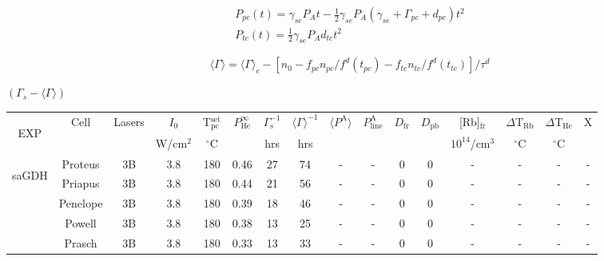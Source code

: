 \documentclass[pdftex,letterpaper,12pt]{report}
\begin{document}
	
\begin{subequations}\label{InitialSpinup}
	\begin{gather}
	P_{pc}(t)=\gamma_{se}P_{A}t-\frac{1}{2}\gamma_{se}P_{A}(\gamma_{se}+\Gamma_{pc}+d_{pc})t^{2}\\
	P_{tc}(t)=\frac{1}{2}\gamma_{se}P_{A}d_{tc}t^{2}
	\end{gather}
\end{subequations}

\begin{equation}
\langle \Gamma\rangle=\langle \Gamma\rangle_{c}-[n_{0}-f_{pc}n_{pc}/f^{d}(t_{pc})- f_{tc}n_{tc}/f^{d}(t_{tc})]/\tau^{d}
\end{equation}

$(\Gamma_{s}-\langle \Gamma\rangle)$  

\begin{table}\scriptsize
	\begin{center}
		\begin{tabular}{|c|c|ccc|ccc|ccccc|cc|c|}
			\hline
			\multirow{2}{*}{\begin{sideways}{EXP}\end{sideways}}&\multirow{2}{*}{Cell} & \multirow{2}{*}{Lasers} & $I_0$ & T$_\mathrm{pc}^\mathrm{set}$ & \multirow{2}{*}{$P_\mathrm{He}^\infty$} & $\Gamma_\mathrm{s}^{-1}$ & $\langle\Gamma\rangle^{-1}$ & \multirow{2}{*}{$\langle P^\mathrm{A} \rangle$} & \multirow{2}{*}{$P_\mathrm{line}^\mathrm{A}$} & \multirow{2}{*}{$D_\mathrm{fr}$} & \multirow{2}{*}{$D_\mathrm{pb}$} & [Rb]$_\mathrm{fr}$ & $\Delta$T$_\mathrm{Rb}$ & $\Delta$T$_\mathrm{He}$ & \multirow{2}{*}{X}\\
			&& & W/cm$^2$ & $^\circ$C & & hrs & hrs & & & & & $10^{14}$/cm$^3$ & $^\circ$C & $^\circ$C &\\
			\hline
			\hline
			\multirow{5}{*}{\begin{sideways}saGDH\end{sideways}} & Proteus & 3B & 3.8 & 180 & 0.46 & 27 & 74 & - & - & 0 & 0 & - & - & - & -\\
			\cline{2-16}
			& Priapus & 3B & 3.8 & 180 & 0.44 & 21 & 56 & - & - & 0 & 0 & - & - & - & -\\
			\cline{2-16}
			& Penelope & 3B & 3.8 & 180 & 0.39 & 18 & 46 & - & - & 0 & 0 & - & - & - & -\\
			\cline{2-16}
			& Powell & 3B & 3.8 & 180 & 0.38 & 13 & 25 & - & - & 0 & 0 & - & - & - & -\\
			\cline{2-16}
			& Prasch & 3B & 3.8 & 180 & 0.33 & 13 & 33 & - & - & 0 & 0 & - & - & - & -\\

\end{tabular}
\end{center}
\end{table}
\end{document}
